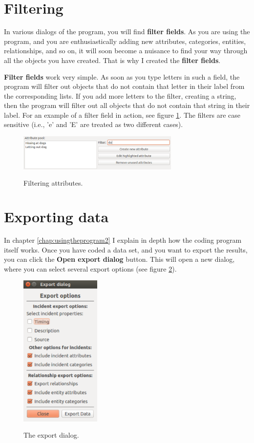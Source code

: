 \documentclass{memoir}
\begin{document}
\section{Filtering}
\label{sec:filtering}

In various dialogs of the program, you will find \textbf{filter fields}. As you are using the program, and you are enthusiastically adding new attributes, categories, entities, relationships, and so on, it will soon become a nuisance to find your way through all the objects you have created. That is why I created the \textbf{filter fields}.

\textbf{Filter fields} work very simple. As soon as you type letters in such a field, the program will filter out objects that do not contain that letter in their label from the corresponding lists. If you add more letters to the filter, creating a string, then the program will filter out all objects that do not contain that string in their label. For an example of a filter field in action, see figure \ref{fig:filteringattributes}. The filters are case sensitive (i.e., 'e' and 'E' are treated as two different cases). 

\begin{figure}[h!]
  \centering
  \caption{Filtering attributes.}
  \includegraphics[width=80mm]{Screenshot_10.pdf}
  \label{fig:filteringattributes}
\end{figure}

\section{Exporting data}
\label{sec:exportingdata}

In chapter \ref{chap:usingtheprogram2} I explain in depth how the coding program itself works. Once you have coded a data set, and you want to export the results, you can click the \textbf{Open export dialog} button. This will open a new dialog, where you can select several export options (see figure \ref{fig:exportdialog}).

\begin{figure}[h!]
  \centering
  \caption{The export dialog.}
  \includegraphics[width=40mm]{Screenshot_6.pdf}
  \label{fig:exportdialog}
\end{figure}
\end{document}
